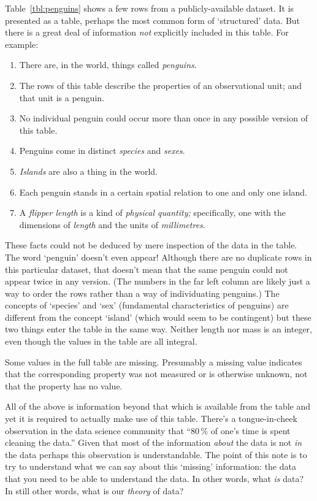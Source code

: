 \documentclass[10pt, a4paper, twocolumn]{article}
\begin{document}
Table~\ref{tbl:penguins} shows a few rows from a publicly-available dataset. It
is presented as a table, perhaps the most common form of `structured' data. But
there is a great deal of information \emph{not} explicitly included in this
table. For example:
\begin{enumerate}
\item{There are, in the world, things called \emph{penguins}.}
\item{The rows of this table describe the properties of an observational unit;
  and that unit is a penguin.}
\item{No individual penguin could occur more than once in any possible version
  of this table.}
\item{Penguins come in distinct \emph{species} and \emph{sexes}.}
\item{\emph{Islands} are also a thing in the world.}
\item{Each penguin stands in a certain spatial relation to one and only one
  island.}
\item{A \emph{flipper length} is a kind of \emph{physical quantity;} specifically, one
  with the dimensions of \emph{length} and the units of \emph{millimetres}.}
 \end{enumerate}
These facts could not be deduced by mere inspection of the data in the
table. The word `penguin' doesn't even appear! Although there are no duplicate
rows in this particular dataset, that doesn't mean that the same penguin could
not appear twice in any version. (The numbers in the far left column are likely
just a way to order the rows rather than a way of individuating penguins.) The
concepts of `species' and `sex' (fundamental characteristics of penguins) are
different from the concept `island' (which would seem to be contingent) but
these two things enter the table in the same way. Neither length nor mass is an
integer, even though the values in the table are all integral.

Some values in the full table are missing. Presumably a missing value indicates
that the corresponding property was not measured or is otherwise unknown, not
that the property has no value. 

All of the above is information beyond that which is available from the table
and yet it is required to actually make use of this table. There's a
tongue-in-cheek observation in the data science community that ``80\,\% of one's
time is spent cleaning the data.'' Given that most of the information
\emph{about} the data is not \emph{in} the data perhaps this observation is
understandable. The point of this note is to try to understand what we can say
about this `missing' information: the data that you need to be able to
understand the data. In other words, what \emph{is} data? In still other words,
what is our \emph{theory} of data?
\end{document}
